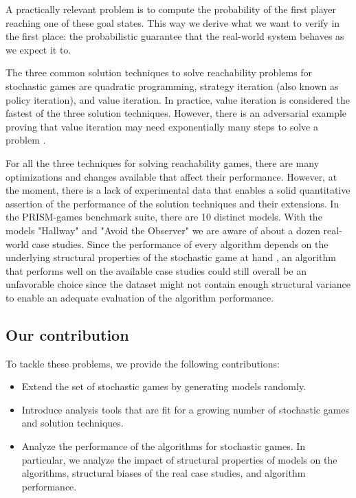 A practically relevant problem is to compute the probability of the first player reaching one of these goal states. 
This way we derive what we want to verify in the first place: 
the probabilistic guarantee that the real-world system behaves as we expect it to.

The three common solution techniques to solve reachability problems for stochastic games are quadratic programming, 
strategy iteration (also known as policy iteration), and value iteration.
In practice, value iteration is considered the fastest of the three solution techniques.
However, there is an adversarial example proving that value iteration may need exponentially many steps to solve a problem \cite{viExponential}.


For all the three techniques for solving reachability games, there are many optimizations and changes available that affect their performance.
However, at the moment, there is a lack of experimental data that enables a solid quantitative assertion of the performance of the solution techniques and their extensions.
In the PRISM-games benchmark suite, there are 10 distinct models. 
With the models "Hallway" and "Avoid the Observer" \cite{cav20} we are aware of about a dozen real-world case studies.
Since the performance of every algorithm depends on the underlying structural properties of the stochastic game at hand \cite{gandalf}, 
an algorithm that performs well on the available case studies could still overall be an unfavorable choice since the dataset might not contain enough
structural variance to enable an adequate evaluation of the algorithm performance.

\subsection*{Our contribution}
To tackle these problems, we provide the following contributions:
\begin{itemize}
    \item Extend the set of stochastic games by generating models randomly.
    \item Introduce analysis tools that are fit for a growing number of stochastic games and solution techniques.
    \item Analyze the performance of the algorithms for stochastic games. 
        In particular, we analyze the impact of structural properties of models on the algorithms, structural biases of the real case studies, and algorithm performance.
\end{itemize}

